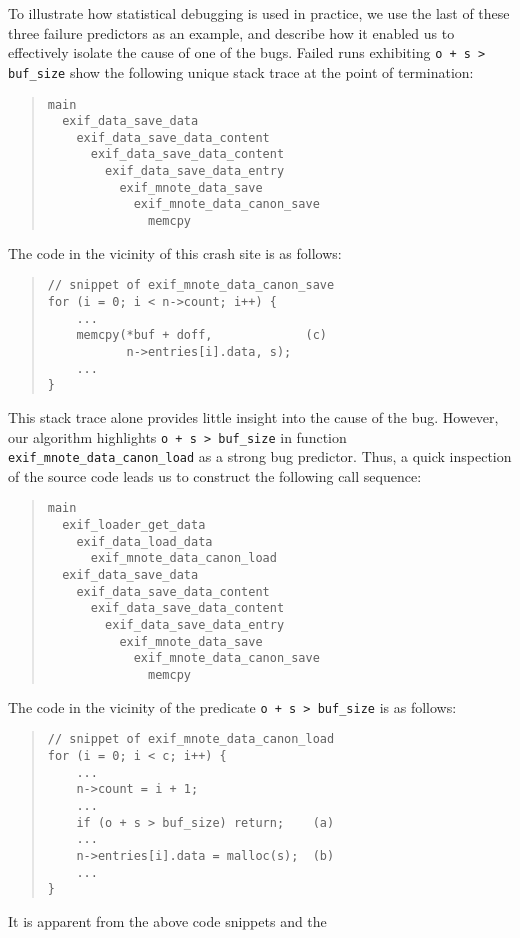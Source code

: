 To illustrate how statistical debugging is used in practice, we
use the last of these three failure predictors as an example, and
describe how it enabled us to
effectively isolate the cause of one of the bugs.  Failed runs
exhibiting \texttt{o + s > buf\_size} show the following unique stack
trace at the point of termination:
\begin{quote}
  \small
\begin{verbatim}
main
  exif_data_save_data
    exif_data_save_data_content
      exif_data_save_data_content
        exif_data_save_data_entry
          exif_mnote_data_save
            exif_mnote_data_canon_save
              memcpy
\end{verbatim}
\end{quote}
The code in the vicinity of this crash site is as follows:
\begin{quote}
\begin{verbatim}
// snippet of exif_mnote_data_canon_save
for (i = 0; i < n->count; i++) {
    ...
    memcpy(*buf + doff,             (c)
           n->entries[i].data, s);
    ...
}
\end{verbatim}
\end{quote}
This stack trace alone provides little insight into the cause of the
bug.  However, our algorithm highlights \texttt{o + s > buf\_size} in
function \texttt{exif\_mnote\_data\_canon\_load} as a strong bug
predictor.  Thus, a quick inspection of the source code leads us to
construct the following call sequence:
\begin{quote}
  \small
\begin{verbatim}
main
  exif_loader_get_data
    exif_data_load_data
      exif_mnote_data_canon_load
  exif_data_save_data
    exif_data_save_data_content
      exif_data_save_data_content
        exif_data_save_data_entry
          exif_mnote_data_save
            exif_mnote_data_canon_save
              memcpy
\end{verbatim}
\end{quote}
The code in the vicinity of the predicate \texttt{o + s > buf\_size} is as follows:
\begin{quote}
\begin{verbatim}
// snippet of exif_mnote_data_canon_load
for (i = 0; i < c; i++) {
    ...
    n->count = i + 1;
    ...
    if (o + s > buf_size) return;    (a)
    ...
    n->entries[i].data = malloc(s);  (b)
    ...
}
\end{verbatim}
\end{quote}
It is apparent from the above code snippets and the

